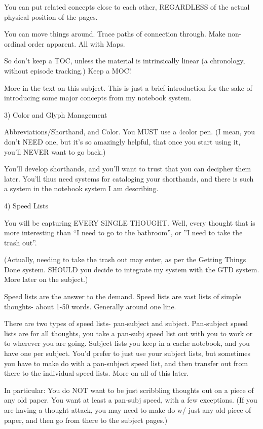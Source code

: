 \documentclass[oneside]{book}
\begin{document}
You can put related concepts close to each other, REGARDLESS of the
actual physical position of the pages.

You can move things around. Trace paths of connection through. Make
non-ordinal order apparent. All with Maps.

So don't keep a TOC, unless the material is intrinsically linear (a
chronology, without episode tracking.) Keep a MOC!

More in the text on this subject. This is just a brief introduction
for the sake of introducing some major concepts from my notebook
system.

3) Color and Glyph Management

Abbreviations/Shorthand, and Color. You MUST use a 4color pen. (I
mean, you don't NEED one, but it's so amazingly helpful, that once you
start using it, you'll NEVER want to go back.)

You'll develop shorthands, and you'll want to trust that you can
decipher them later. You'll thus need systems for cataloging your
shorthands, and there is such a system in the notebook system I am
describing.

4) Speed Lists

You will be capturing EVERY SINGLE THOUGHT. Well, every thought that
is more interesting than ``I need to go to the bathroom'', or ''I need to
take the trash out''.

(Actually, needing to take the trash out may enter, as per the Getting
Things Done system. SHOULD you decide to integrate my system with the
GTD system. More later on the subject.)

Speed lists are the answer to the demand. Speed lists are vast lists
of simple thoughts- about 1-50 words. Generally around one line.

There are two types of speed lists- pan-subject and
subject. Pan-subject speed lists are for all thoughts, you take a
pan-subj speed list out with you to work or to wherever you are
going. Subject lists you keep in a cache notebook, and you have one
per subject. You'd prefer to just use your subject lists, but
sometimes you have to make do with a pan-subject speed list, and then
transfer out from there to the individual speed lists. More on all of
this later.

In particular: You do NOT want to be just scribbling thoughts out on a
piece of any old paper. You want at least a pan-subj speed, with a few
exceptions. (If you are having a thought-attack, you may need to make
do w/ just any old piece of paper, and then go from there to the
subject pages.)
\end{document}
